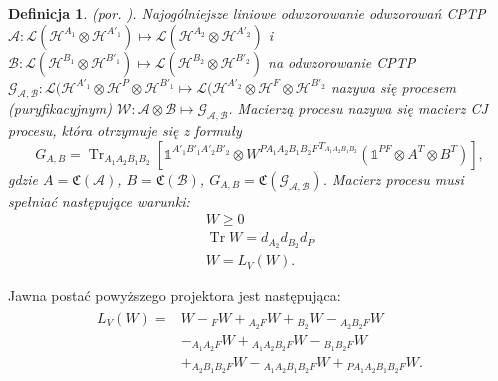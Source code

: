 \documentclass[10pt]{article} %
\newtheorem{definicja}{Definicja}
\DeclareMathOperator{\Trs}{Tr}
\newcommand{\Hx}[1]{\mathcal{H}^{#1}}
\newcommand{\I}{\mathbb{1}}
\newcommand{\MCJ}{\mathfrak{C}}
\begin{document}
\begin{definicja}
(por. \cite{purification}).
Najogólniejsze liniowe odwzorowanie odwzorowań CPTP $\mathcal{A}: \mathcal{L}(\Hx{A_1} \otimes \Hx{A'_1}) \mapsto  \mathcal{L}(\Hx{A_2} \otimes \Hx{A'_2})$ i $\mathcal{B}: \mathcal{L}(\Hx{B_1} \otimes \Hx{B'_1}) \mapsto  \mathcal{L}(\Hx{B_2} \otimes \Hx{B'_2})$ na odwzorowanie CPTP $\mathcal{G_{A,B}}: \mathcal{L}(\Hx{A'_1} \otimes \Hx{P} \otimes \Hx{B'_1} \mapsto \mathcal{L}(\Hx{A'_2} \otimes \Hx{F} \otimes \Hx{B'_2}$ nazywa się procesem (puryfikacyjnym) $\mathcal{W}: \mathcal{A} \otimes \mathcal{B} \mapsto \mathcal{G_{A,B}}$. Macierzą procesu nazywa się macierz CJ procesu, która otrzymuje się z formuły\cite{purification}
\begin{equation}
G_{A,B} = \Trs_{A_1A_2B_1B_2}\left[ \I^{A'_1B'_1A'_2B'_2} \otimes {W^{PA_1A_2B_1B_2F}}^{T_{A_1A_2B_1B_2}} \left( \I^{PF} \otimes A^T \otimes B^T\right)\right],
\end{equation}
gdzie $A = \MCJ({\mathcal{A}})$, $B = \MCJ(\mathcal{B})$, $G_{A,B} = \MCJ(\mathcal{G_{A,B}})$.
Macierz procesu musi spełniać następujące warunki:
\begin{gather}
W \geq 0 \\
\Trs W = d_{A_2}d_{B_2}d_P \\
W = L_V(W).
\end{gather} 
\end{definicja}
Jawna postać powyższego projektora jest następująca:
\begin{align}
\begin{split}
L_V(W) =& W -{}_FW + {}_{A_2F}W + {}_{B_2}W - {}_{A_2B_2F}W\\ &- {}_{A_1A_2F}W + {}_{A_1A_2B_2F}W - {}_{B_1B_2F}W \\&+ {}_{A_2B_1B_2F}W - {}_{A_1A_2B_1B_2F}W + {}_{PA_1A_2B_1B_2F}W.
\end{split}
\end{align}
\end{document}
